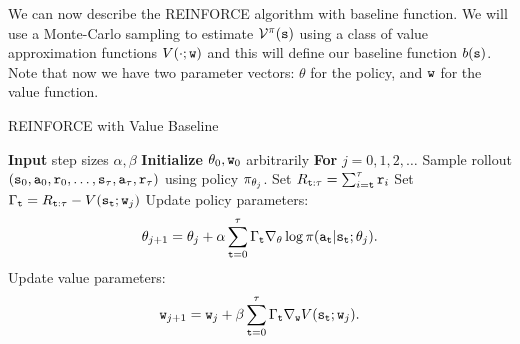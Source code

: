 We can now describe the REINFORCE algorithm with baseline function.
We will use a Monte-Carlo sampling to estimate
$\mathcal{V}^\pi({\tt s})$ using a class of value approximation functions $V(\cdot;{\tt w})$ and this will define our baseline function
$b({\tt s})$. Note that now we have two parameter vectors: $\theta$ for the policy, and ${\tt w}$ for the value function.

\begin{algorithm}[H]
\caption{REINFORCE with Value Baseline}
\begin{algorithmic}[1]
\State \textbf{Input} step sizes $\alpha,\beta$
\State \textbf{Initialize} $\theta_0, {\tt w}_0$ arbitrarily
\State \textbf{For} $j = 0,1,2,\dots$
\State \quad Sample rollout $({\tt s}_0, {\tt a}_0, {\tt r}_0, \ldots, {\tt s}_\tau, {\tt a}_\tau, {\tt r}_\tau)$ using policy $\pi_{\theta_j}$.
\State \quad Set $R_{{\tt t}:\tau} = \sum_{i={\tt t}}^\tau {\tt r}_i$
\State \quad Set $\Gamma_{\tt t} = R_{{\tt t}:\tau}-V({\tt s}_{\tt t};{\tt w}_j)$
\State \quad Update policy parameters:
\[
\theta_{j+1} = \theta_j + \alpha \sum_{{\tt t}=0}^{\tau} \Gamma_{\tt t} \nabla_\theta \log \pi({\tt a}_{\tt t} | {\tt s}_{\tt t}; \theta_j).
\]
\State \quad Update value parameters:
\[
{\tt w}_{j+1} = {\tt w}_j + \beta \sum_{{\tt t}=0}^{\tau} \Gamma_{\tt t} \nabla_{{\tt w}} V({\tt s}_{\tt t};{\tt w}_j).
\]
\end{algorithmic}
\end{algorithm}

